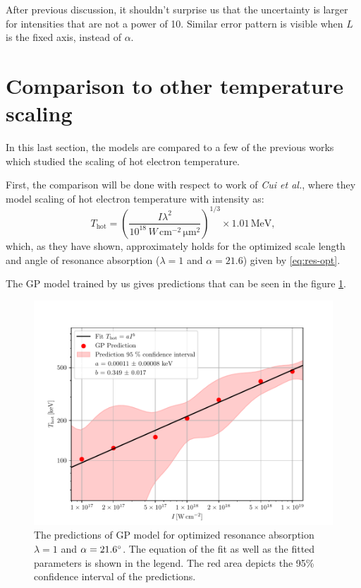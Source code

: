 After previous discussion, it shouldn't surprise us that the uncertainty is larger for intensities that are not a power of 10. Similar error pattern is visible when $L$ is the fixed axis, instead of $\alpha$.



\section{Comparison to other temperature scaling}
\label{ch:comparison}
In this last section, the models are compared to a few of the previous works which studied the scaling of hot electron temperature.

First, the comparison will be done with respect to work of \textit{Cui et al.}\cite{cui2013}, where they model scaling of hot electron temperature with intensity as: 
\begin{equation}
	\label{eq:cui-scale}
	T_{\mathrm{hot}} = \left(\frac{I\lambda^2}{10^{18} \, W \, \mathrm{cm}^{-2} \, \mathrm{\mu m}^2}\right)^{1/3} \times 1.01 \, \mathrm{MeV},
\end{equation}
which, as they have shown, approximately holds for the optimized scale length and angle of resonance absorption ($\lambda = 1$ and $\alpha = 21.6$) given by \ref{eq:res-opt}.

The GP model trained by us gives predictions that can be seen in the figure \ref{fig:cui-compare-1}.

\begin{figure}[h]
	\centering
	\includegraphics[width=0.95 \textwidth]{figures/cui_compare1}
	\caption{The predictions of GP model for optimized resonance absorption $\lambda = 1$ and $\alpha = 21.6 \degree$. The equation of the fit as well as the fitted parameters is shown in the legend. The red area depicts the 95\% confidence interval of the predictions.}
	\label{fig:cui-compare-1}
\end{figure}

